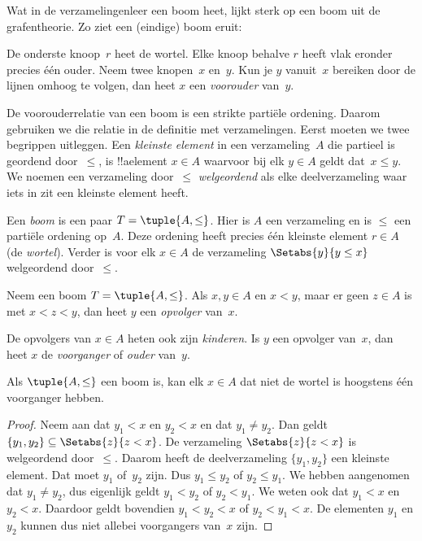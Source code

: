 \documentclass[openany]{memoir}
\begin{document}
Wat in de verzamelingenleer een boom heet, lijkt sterk op een boom uit
de grafentheorie. Zo ziet een (eindige) boom eruit:

\begin{center}
\end{center}

De onderste knoop~$r$ heet de wortel. Elke knoop behalve $r$ heeft
vlak eronder precies één ouder. Neem twee knopen~$x$ en~$y$. Kun je
$y$ vanuit~$x$ bereiken door de lijnen omhoog te volgen, dan heet $x$
een \emph{voorouder} van~$y$.

De voorouderrelatie van een boom is een strikte partiële ordening.
Daarom gebruiken we die relatie in de definitie met verzamelingen.
Eerst moeten we twee begrippen uitleggen. Een \emph{kleinste element}
in een verzameling~$A$ die partieel is geordend door~$\le$, is
!!a{element} $x \in A$ waarvoor bij elk $y \in A$ geldt dat~$x \le y$.
We noemen een verzameling door~$\le$ \emph{welgeordend} als elke
deelverzameling waar iets in zit een kleinste element heeft.

\begin{defn}[Boom]
Een \emph{boom} is een paar $T = \tuple{A, \le}$. Hier is $A$ een
verzameling en is $\le$ een partiële ordening op~$A$. Deze ordening
heeft precies één kleinste element $r \in A$ (de \emph{wortel}).
Verder is voor elk $x \in A$ de verzameling
$\Setabs{y}{y \le x}$ welgeordend door~$\le$.
\end{defn}

\begin{defn}[Opvolgers]
Neem een boom $T = \tuple{A, \le}$.
Als $x,y \in A$ en $x < y$, maar er geen $z \in A$ is met
$x < z < y$, dan heet $y$ een \emph{opvolger} van~$x$.
\end{defn}

De opvolgers van $x \in A$ heten ook zijn \emph{kinderen}. Is $y$ een
opvolger van~$x$, dan heet $x$ de \emph{voorganger} of \emph{ouder}
van~$y$.

\begin{prop}
Als $\tuple{A,\le}$ een boom is, kan elk $x \in A$ dat niet de wortel
is hoogstens één voorganger hebben.
\end{prop}

\begin{proof}
  Neem aan dat $y_1 < x$ en $y_2 < x$ en dat $y_1 \neq y_2$. Dan
  geldt $\{y_1, y_2\} \subseteq \Setabs{z}{z<x}$. De verzameling
  $\Setabs{z}{z<x}$ is welgeordend door~$\le$. Daarom heeft de
  deelverzameling $\{y_1, y_2\}$ een kleinste element. Dat moet $y_1$
  of~$y_2$ zijn. Dus $y_1 \le y_2$ of $y_2 \le y_1$. We hebben
  aangenomen dat $y_1 \neq y_2$, dus eigenlijk geldt $y_1 < y_2$ of
  $y_2 < y_1$. We weten ook dat $y_1 < x$ en $y_2 < x$. Daardoor
  geldt bovendien $y_1 < y_2 < x$ of $y_2 < y_1 < x$. De elementen
  $y_1$ en $y_2$ kunnen dus niet allebei voorgangers van~$x$ zijn.
\end{proof}
\end{document}
